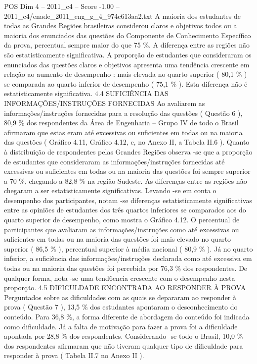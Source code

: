 \begin{textsample}{POS Dim 4 – 2011\_c4 – Score -1.00 – 2011\_c4/enade\_2011\_eng\_g\_4\_974c613aa2.txt}
A maioria dos estudantes de todas as Grandes Regiões brasileiras considerou claros e objetivos todos ou a maioria dos enunciados das questões do Componente de Conhecimento Específico da prova, percentual sempre maior do que 75 \%.
A diferença entre as regiões não são estatisticamente significativa.
A proporção de estudantes que consideraram os enunciados das questões claros e objetivos apresenta uma tendência crescente em relação ao aumento de desempenho : mais elevada no quarto superior ( 80,1 \% ) se comparada ao quarto inferior de desempenho ( 75,1 \% ).
Esta diferença não é estatisticamente significativa. 4.4 SUFICIÊNCIA DAS INFORMAÇÕES/INSTRUÇÕES FORNECIDAS Ao avaliarem as informações/instruções fornecidas para a resolução das questões ( Questão 6 ), 80,9 \% dos respondentes da Área de Engenharia – Grupo IV de todo o Brasil afirmaram que estas eram até excessivas ou suficientes em todas ou na maioria das questões ( Gráfico 4.11, Gráfico 4.12, e, no Anexo II, a Tabela II.6 ).
Quanto à distribuição de respondentes pelas Grandes Regiões observa -se que a proporção de estudantes que consideraram as informações/instruções fornecidas até excessivas ou suficientes em todas ou na maioria das questões foi sempre superior a 70 \%, chegando a 82,8 \% na região Sudeste.
As diferenças entre as regiões não chegaram a ser estatisticamente significativas.
Levando -se em conta o desempenho dos participantes, notam -se diferenças estatisticamente significativas entre as opiniões de estudantes dos três quartos inferiores se comparados aos do quarto superior de desempenho, como mostra o Gráfico 4.12.
O percentual de participantes que avaliaram as informações/instruções como até excessivas ou suficientes em todas ou na maioria das questões foi mais elevado no quarto superior ( 86,5 \% ), percentual superior à média nacional ( 80,9 \% ).
Já no quarto inferior, a suficiência das informações/instruções declarada como até excessiva em todas ou na maioria das questões foi percebida por 76,3 \% dos respondentes.
De qualquer forma, nota -se uma tend6encia crescente com o desempenho nesta proporção. 4.5 DIFICULDADE ENCONTRADA AO RESPONDER À PROVA Perguntados sobre as dificuldades com as quais se depararam ao responder à prova ( Questão 7 ), 13,5 \% dos estudantes apontaram o desconhecimento do conteúdo.
Para 36,8 \%, a forma diferente de abordagem do conteúdo foi indicada como dificuldade.
Já a falta de motivação para fazer a prova foi a dificuldade apontada por 28,8 \% dos respondentes.
Considerando -se todo o Brasil, 10,0 \% dos respondentes afirmaram que não tiveram qualquer tipo de dificuldade para responder à prova ( Tabela II.7 no Anexo II ).

\end{textsample}
